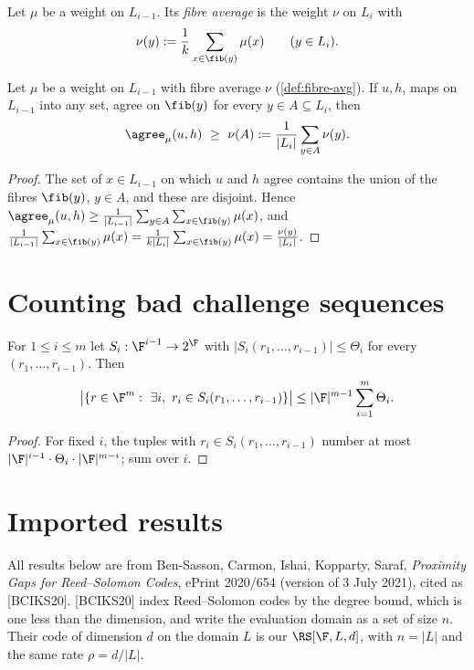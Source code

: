 \begin{definition}\label{def:fibre-avg}\leanok{}
Let $\mu$ be a weight on $L_{i-1}$. Its \emph{fibre average} is the weight $\nu$ on $L_i$ with
\[
\nu(y):=\frac1k\sum_{x\in\fib(y)}\mu(x)\qquad(y\in L_i).
\]
\end{definition}

\begin{lemma}[Lifting]\label{lem:lift}
Let $\mu$ be a weight on $L_{i-1}$ with fibre average $\nu$ (\ref{def:fibre-avg}). If $u,h$, maps
on $L_{i-1}$ into any set, agree on $\fib(y)$ for every $y\in A\subseteq L_i$, then
\[
\agree_\mu(u,h)\ \ge\ \nu(A):=\frac1{|L_i|}\sum_{y\in A}\nu(y).
\]
\end{lemma}

\begin{proof}
The set of $x\in L_{i-1}$ on which $u$ and $h$ agree contains the union of the fibres $\fib(y)$,
$y\in A$, and these are disjoint. Hence
$\agree_\mu(u,h)\ge\frac1{|L_{i-1}|}\sum_{y\in A}\sum_{x\in\fib(y)}\mu(x)$, and
$\frac1{|L_{i-1}|}\sum_{x\in\fib(y)}\mu(x)=\frac1{k|L_i|}\sum_{x\in\fib(y)}\mu(x)=\frac{\nu(y)}{|L_i|}$.
\end{proof}

\section{Counting bad challenge sequences}

\begin{lemma}\label{lem:bad-count}
For $1\le i\le m$ let $S_i:\F^{i-1}\to2^{\F}$ with $|S_i(r_1,\dots,r_{i-1})|\le\Theta_i$ for
every $(r_1,\dots,r_{i-1})$. Then
\[
\big|\{r\in\F^m:\ \exists i,\ r_i\in S_i(r_1,\dots,r_{i-1})\}\big|
\le|\F|^{m-1}\sum_{i=1}^m\Theta_i .
\]
\end{lemma}

\begin{proof}
For fixed $i$, the tuples with $r_i\in S_i(r_1,\dots,r_{i-1})$ number at most
$|\F|^{i-1}\cdot\Theta_i\cdot|\F|^{m-i}$; sum over $i$.
\end{proof}

\section{Imported results}

All results below are from Ben-Sasson, Carmon, Ishai, Kopparty, Saraf,
\emph{Proximity Gaps for Reed--Solomon Codes}, ePrint 2020/654 (version of 3 July 2021),
cited as [BCIKS20]. [BCIKS20] index Reed--Solomon codes by the degree bound, which is one less than the dimension,
and write the evaluation domain as a set of size $n$. Their code of dimension $d$ on the domain
$L$ is our $\RS[\F,L,d]$, with $n=|L|$ and the same rate $\rho=d/|L|$.

